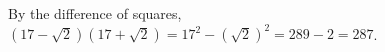 By the difference of squares, $\left(17-\sqrt2\right)\left(17+\sqrt2\right)=17^2-\left(\sqrt2\right)^2=289-2=\boxed{287}$.
